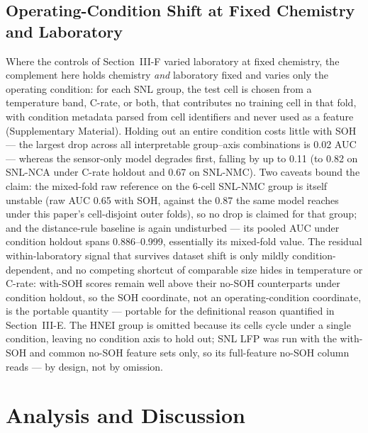 \documentclass[11pt,a4paper]{article}
\begin{document}
\subsection{Operating-Condition Shift at Fixed Chemistry and Laboratory}
Where the controls of Section~III-F varied laboratory at fixed chemistry, the complement here holds chemistry \emph{and} laboratory fixed and varies only the operating condition: for each SNL group, the test cell is chosen from a temperature band, C-rate, or both, that contributes no training cell in that fold, with condition metadata parsed from cell identifiers and never used as a feature (Supplementary Material). Holding out an entire condition costs little with SOH --- the largest drop across all interpretable group--axis combinations is 0.02 AUC --- whereas the sensor-only model degrades first, falling by up to 0.11 (to 0.82 on SNL-NCA under C-rate holdout and 0.67 on SNL-NMC). Two caveats bound the claim: the mixed-fold raw reference on the 6-cell SNL-NMC group is itself unstable (raw AUC 0.65 with SOH, against the 0.87 the same model reaches under this paper's cell-disjoint outer folds), so no drop is claimed for that group; and the distance-rule baseline is again undisturbed --- its pooled AUC under condition holdout spans 0.886--0.999, essentially its mixed-fold value. The residual within-laboratory signal that survives dataset shift is only mildly condition-dependent, and no competing shortcut of comparable size hides in temperature or C-rate: with-SOH scores remain well above their no-SOH counterparts under condition holdout, so the SOH coordinate, not an operating-condition coordinate, is the portable quantity --- portable for the definitional reason quantified in Section~III-E. The HNEI group is omitted because its cells cycle under a single condition, leaving no condition axis to hold out; SNL LFP was run with the with-SOH and common no-SOH feature sets only, so its full-feature no-SOH column reads --- by design, not by omission.

\section{Analysis and Discussion}
\end{document}
